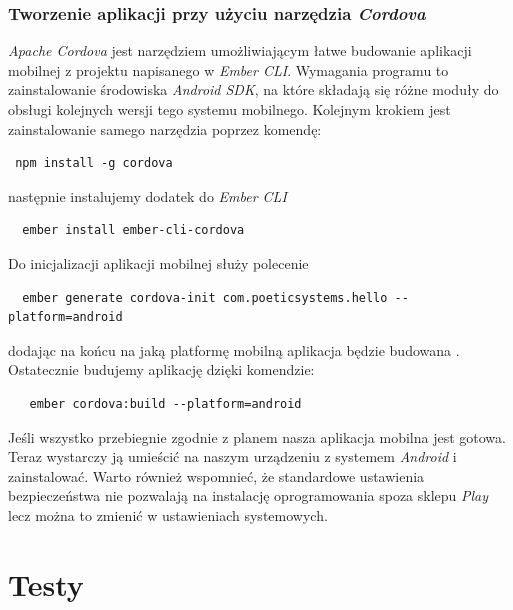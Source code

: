 \documentclass[openright]{xmgr}
\begin{document}
\subsection{Tworzenie aplikacji przy użyciu narzędzia \textit{Cordova}}
\textit{Apache Cordova} jest narzędziem umożliwiającym łatwe budowanie aplikacji mobilnej z projektu napisanego w \textit{Ember CLI}. Wymagania programu  to zainstalowanie środowiska \textit{Android SDK}, na które składają się różne moduły do obsługi kolejnych wersji tego systemu mobilnego. Kolejnym krokiem jest zainstalowanie samego narzędzia poprzez komendę:
\begin{verbatim}
 npm install -g cordova
 \end{verbatim}
  następnie instalujemy dodatek do \textit{Ember CLI} 
  \begin{verbatim}
  ember install ember-cli-cordova
  \end{verbatim}
  Do inicjalizacji aplikacji mobilnej służy polecenie 
  \begin{verbatim}
  ember generate cordova-init com.poeticsystems.hello --platform=android
  \end{verbatim}
   dodając na końcu na jaką platformę mobilną aplikacja będzie budowana . Ostatecznie budujemy aplikację dzięki komendzie:
    \begin{verbatim}
   ember cordova:build --platform=android
   \end{verbatim}
   Jeśli wszystko przebiegnie zgodnie z planem nasza aplikacja mobilna jest gotowa. Teraz wystarczy ją umieścić na naszym urządzeniu z systemem \textit{Android} i zainstalować. Warto również wspomnieć, że standardowe ustawienia bezpieczeństwa nie pozwalają na instalację oprogramowania spoza sklepu \textit{Play} lecz można to zmienić w ustawieniach systemowych.
\chapter{Testy}
\end{document}
